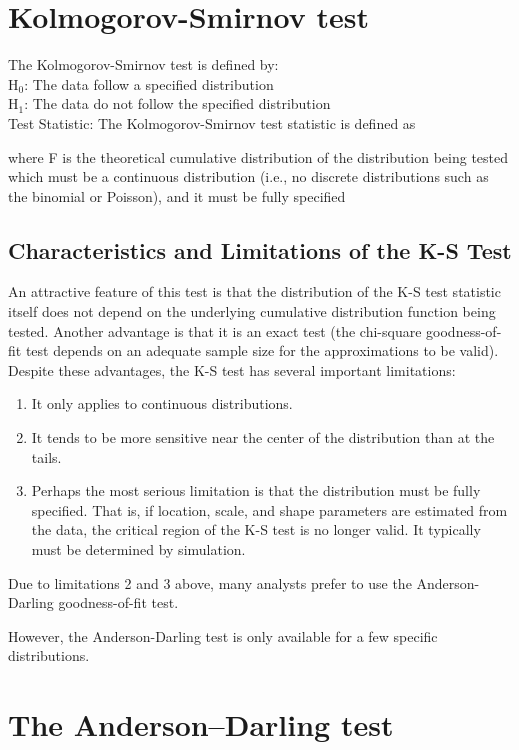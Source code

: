 \documentclass[a4paper,12pt]{article}
\begin{document}
\section{Kolmogorov-Smirnov test}
 The Kolmogorov-Smirnov test is defined by:
\\
H$_0$:     The data follow a specified distribution\\
H$_1$:     The data do not follow the specified distribution\\

Test Statistic:     The Kolmogorov-Smirnov test statistic is defined as

where F is the theoretical cumulative distribution of the distribution being tested which must be a continuous distribution (i.e., no discrete distributions such as the binomial or Poisson), and it must be fully specified

\subsection{ Characteristics and Limitations of the K-S Test}


An attractive feature of this test is that the distribution of the K-S test statistic itself does not depend on the underlying cumulative distribution function being tested. Another advantage is that it is an exact test (the chi-square goodness-of-fit test depends on an adequate sample size for the approximations to be valid). Despite these advantages, the K-S test has several important limitations:
\begin{enumerate}
\item It only applies to continuous distributions.
\item It tends to be more sensitive near the center of the distribution than at the tails.
\item Perhaps the most serious limitation is that the distribution must be fully specified. That is, if location, scale, and shape parameters are estimated from the data, the critical region of the K-S test is no longer valid. It typically must be determined by simulation.
\end{enumerate}
Due to limitations 2 and 3 above, many analysts prefer to use the Anderson-Darling goodness-of-fit test.

However, the Anderson-Darling test is only available for a few specific distributions.

\section{The Anderson–Darling test}
\end{document}
